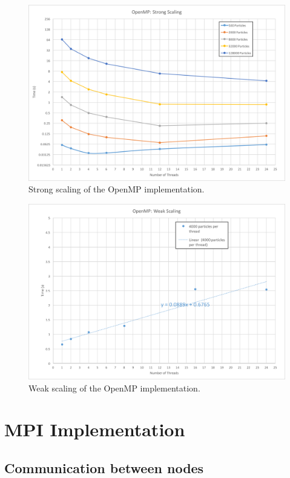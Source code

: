 \documentclass[12pt]{article}
\begin{document}
\begin{figure}
\includegraphics[width=\textwidth]{graphs/openmp_strong_scaling.png}
  \caption{Strong scaling of the OpenMP implementation.}
  \label{fig:openmp-strong}
\end{figure}

\begin{figure}
\includegraphics[width=\textwidth]{graphs/weak_scaling.png}
  \caption{Weak scaling of the OpenMP implementation.}
  \label{fig:openmp-weak}
\end{figure}

\section{MPI Implementation}

\subsection{Communication between nodes}
\end{document}
